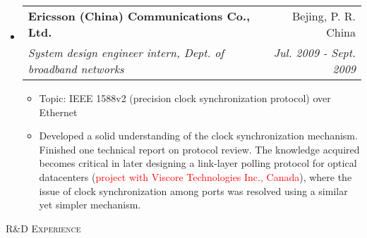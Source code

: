 \documentclass[letterpaper,11pt]{article}
\makeatletter
\newcommand{\resheading}[1]{{\noindent\large \colorbox{mygrey}{
\begin{minipage}{1.0\textwidth}{\textsc{#1 \vphantom{p\^{E}}}}\end{minipage}}}}
\newcommand{\ressubheading}[4]{
\begin{tabular*}{6.69in}{l@{\extracolsep{\fill}}r}
        \textbf{#1} & #2 \\
        \textit{#3} & \textit{#4} \\
\end{tabular*}\vspace{-6pt}
}
\newcommand{\resitem}[1]{\item #1 \vspace{-2pt}}
\makeatother
\begin{document}
\begin{itemize}
\item
    \ressubheading{Ericsson (China) Communications Co., Ltd.}{Bejing, P. R. China}%
    {System design engineer intern, Dept. of broadband networks}{Jul. 2009 - Sept. 2009}
    \begin{itemize}
        \resitem{Topic: IEEE 1588v2 (precision clock synchronization protocol) over Ethernet}
        \resitem{Developed a solid understanding of the clock synchronization mechanism. Finished one technical report on protocol review. The knowledge acquired becomes critical in later designing a link-layer polling protocol for optical datacenters (\textcolor{Red}{project with Viscore Technologies Inc., Canada}), where the issue of clock synchronization among ports was resolved using a similar yet simpler mechanism.}
    \end{itemize}

\end{itemize}



\resheading{R\&D Experience}%
\end{document}
